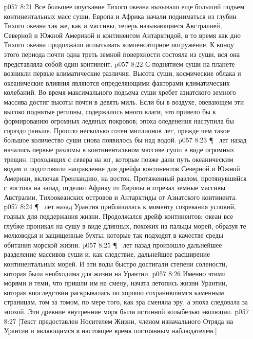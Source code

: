 \vs p057 8:21 Все большее опускание Тихого океана вызывало еще больший подъем континентальных масс суши. Европа и Африка начали подниматься из глубин Тихого океана так же, как и массивы, теперь называющиеся Австралией, Северной и Южной Америкой и континентом Антарктидой, в то время как дно Тихого океана продолжало испытывать компенсаторное погружение. К концу этого периода почти одна треть земной поверхности состояла из суши, вся она представляла собой один континент.
\vs p057 8:22 С поднятием суши на планете возникли первые климатические различия. Высота суши, космические облака и океанические влияния являются определяющими факторами климатических колебаний. Во время максимального подъема суши хребет азиатского земного массива достиг высоты почти в девять миль. Если бы в воздухе, овевающем эти высоко поднятые регионы, содержалось много влаги, это привело бы к формированию огромных ледяных покровов; эпоха оледенения наступила бы гораздо раньше. Прошло несколько сотен миллионов лет, прежде чем такое большое количество суши снова появилось бы над водой.
\vs p057 8:23 \P\  лет назад начались первые разломы в континентальном массиве суши в виде огромных трещин, проходящих с севера на юг, которые позже дали путь океаническим водам и подготовили направление для дрейфа континентов Северной и Южной Америки, включая Гренландию, на восток. Протяженный разлом, протянувшийся с востока на запад, отделил Африку от Европы и отрезал земные массивы Австралии, Тихоокеанских островов и Антарктиды от Азиатского континента.
\vs p057 8:24 \P\  лет назад Урантия приблизилась к моменту созревания условий, годных для поддержания жизни. Продолжался дрейф континентов; океан все глубже проникал на сушу в виде длинных, похожих на пальцы морей, образуя те мелководья и защищенные бухты, которые так подходят в качестве среды обитания морской жизни.
\vs p057 8:25 \P\  лет назад произошло дальнейшее разделение массивов суши и, как следствие, дальнейшее расширение континентальных морей. И эти воды быстро достигали степени солености, которая была необходима для жизни на Урантии.
\vs p057 8:26 Именно этими морями и теми, что пришли им на смену, начата летопись жизни Урантии, которая впоследствии раскрывалась по хорошо сохранившимся каменным страницам, том за томом, по мере того, как эра сменяла эру, а эпоха следовала за эпохой. Эти древние внутренние моря были истинной колыбелью эволюции.
\vs p057 8:27 [Текст предоставлен Носителем Жизни, членом изначального Отряда на Урантии и являющимся в настоящее время постоянным наблюдателем.]

